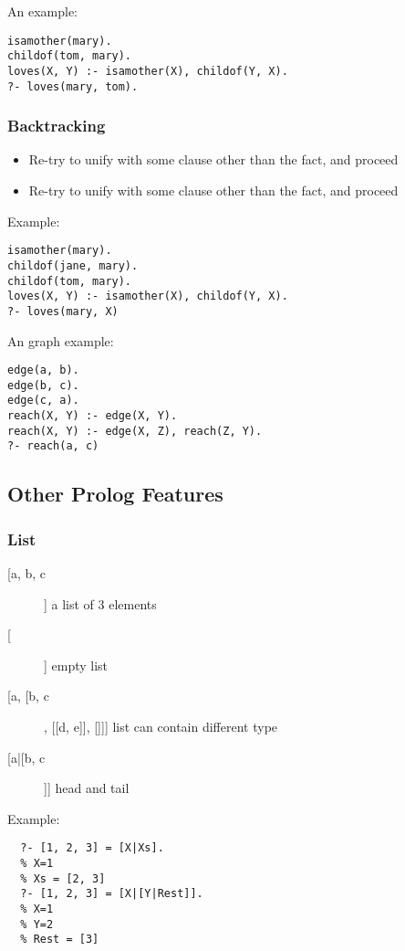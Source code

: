 An example:
\begin{lstlisting}
isamother(mary).
childof(tom, mary).
loves(X, Y) :- isamother(X), childof(Y, X).
?- loves(mary, tom).
\end{lstlisting}

\subsubsection{Backtracking}

\begin{itemize}
\item Re-try to unify with some clause other than the fact, and proceed
\item Re-try to unify with some clause other than the fact, and proceed
\end{itemize}

Example:
\begin{lstlisting}
isamother(mary).
childof(jane, mary).
childof(tom, mary).
loves(X, Y) :- isamother(X), childof(Y, X).
?- loves(mary, X)
\end{lstlisting}

An graph example:
\begin{lstlisting}
edge(a, b).
edge(b, c).
edge(c, a).
reach(X, Y) :- edge(X, Y).
reach(X, Y) :- edge(X, Z), reach(Z, Y).
?- reach(a, c)
\end{lstlisting}

\subsection{Other Prolog Features}
\subsubsection{List}

\begin{description}
\item [[a, b, c]] a list of 3 elements
\item [[]] empty list
\item [[a, [b, c], [[d, e]], []]] list can contain different type
\item [[a|[b, c]]] head and tail
\end{description}

Example:
\begin{lstlisting}
  ?- [1, 2, 3] = [X|Xs].
  % X=1
  % Xs = [2, 3]
  ?- [1, 2, 3] = [X|[Y|Rest]].
  % X=1
  % Y=2
  % Rest = [3]
\end{lstlisting}

